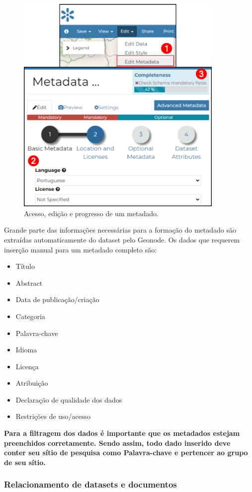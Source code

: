 \documentclass[12pt]{article}
\begin{document}
\begin{figure}[ht]
  \centering
  \includegraphics[width=10cm, keepaspectratio]{img/metadado.pdf}
  \caption{Acesso, edição e progresso de um metadado.}
  \label{fig:metadado}
\end{figure}

Grande parte das informações necessárias para a formação do metadado são
extraídas automaticamente do dataset pelo Geonode. Os dados que requerem
inserção manual para um metadado completo são:

\begin{itemize}
  \item Título
  \item Abstract
  \item Data de publicação/criação
  \item Categoria
  \item Palavra-chave
  \item Idioma
  \item Licença
  \item Atribuição
  \item Declaração de qualidade dos dados
  \item Restrições de uso/acesso
\end{itemize}

\textbf{Para a filtragem dos dados é importante que os metadados
 estejam preenchidos corretamente. Sendo assim, todo dado inserido deve conter
 seu sítio de pesquisa como Palavra-chave e pertencer ao grupo de seu sítio.}

\subsubsection{Relacionamento de datasets e documentos}
\end{document}
